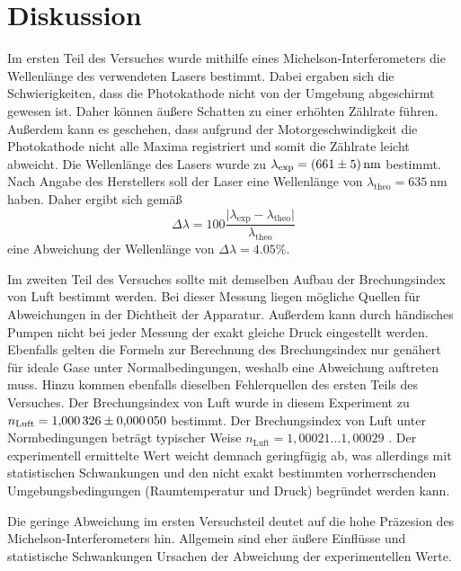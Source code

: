 \section{Diskussion}
\label{sec:Diskussion}
Im ersten Teil des Versuches wurde mithilfe eines Michelson-Interferometers die Wellenlänge des verwendeten Lasers bestimmt. Dabei ergaben sich die Schwierigkeiten, dass die Photokathode 
nicht von der Umgebung abgeschirmt gewesen ist. Daher können äußere Schatten zu einer erhöhten Zählrate führen. Außerdem kann es geschehen, dass aufgrund der 
Motorgeschwindigkeit die Photokathode nicht alle Maxima registriert und somit die Zählrate leicht abweicht. 
Die Wellenlänge des Lasers wurde zu $\lambda_\text{exp} = \qty{661 +- 5}{\nano\metre}$ bestimmt. Nach Angabe des Herstellers soll der Laser eine Wellenlänge von
$\lambda_\text{theo} = \qty{635}{\nano\metre}$ haben.
Daher ergibt sich gemäß 
\begin{equation*}
    \Delta\lambda = 100\frac{\lvert \lambda_\text{exp} - \lambda_\text{theo}\rvert}{\lambda_\text{theo}}
\end{equation*}
eine Abweichung der Wellenlänge von $\Delta\lambda = 4.05\%$.

Im zweiten Teil des Versuches sollte mit demselben Aufbau der Brechungsindex von Luft bestimmt werden. Bei dieser Messung liegen mögliche Quellen für Abweichungen in der Dichtheit
der Apparatur. Außerdem kann durch händisches Pumpen nicht bei jeder Messung der exakt gleiche Druck eingestellt werden. Ebenfalls gelten die Formeln zur Berechnung des Brechungsindex
nur genähert für ideale Gase unter Normalbedingungen, weshalb eine Abweichung auftreten muss. Hinzu kommen ebenfalls dieselben Fehlerquellen des ersten 
Teils des Versuches.
Der Brechungsindex von Luft wurde in diesem Experiment zu $n_\text{Luft} = \num{1.000326+-0.00005}$ bestimmt.
Der Brechungsindex von Luft unter Normbedingungen beträgt typischer Weise $n_\text{Luft} = 1,00021 ... 1,00029$ \cite{Ingenieurwissen}. 
Der experimentell ermittelte Wert weicht demnach geringfügig ab, was allerdings mit statistischen Schwankungen und den nicht exakt bestimmten vorherrschenden
Umgebungsbedingungen (Raumtemperatur und Druck) begründet werden kann.

Die geringe Abweichung im ersten Versuchsteil deutet auf die hohe Präzesion des Michelson-Interferometers hin. Allgemein sind eher äußere Einflüsse und statistische Schwankungen
Ursachen der Abweichung der experimentellen Werte. 
